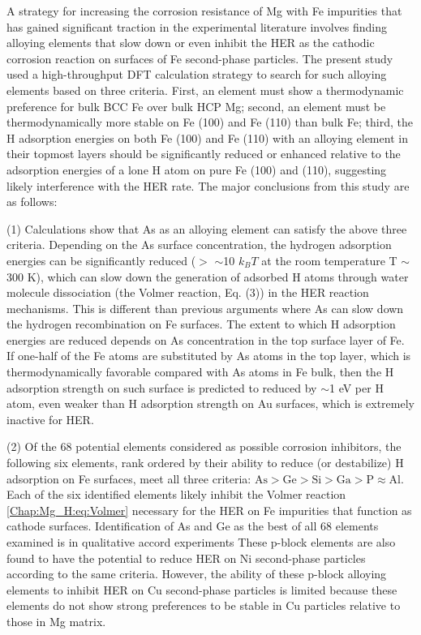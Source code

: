 A strategy for increasing the corrosion resistance of Mg with Fe impurities that has gained significant traction in the experimental literature involves finding alloying elements that slow down or even inhibit the HER as the cathodic corrosion reaction on surfaces of Fe second-phase particles. The present study used a high-throughput DFT calculation strategy to search for such alloying elements based on three criteria. First, an element must show a thermodynamic preference for bulk BCC Fe over bulk HCP Mg; second, an element must be thermodynamically more stable on Fe (100) and Fe (110) than bulk Fe; third, the H adsorption energies on both Fe (100) and Fe (110) with an alloying element in their topmost layers should be significantly reduced or enhanced relative to the adsorption energies of a lone H atom on pure Fe (100) and (110), suggesting likely interference with the HER rate. The major conclusions from this study are as follows:

 (1) Calculations show that As as an alloying element can satisfy the above three criteria. Depending on the As surface concentration, the hydrogen adsorption energies can be significantly reduced ($>$ $\sim$10 $k_{B}T$ at the room temperature T $\sim$ 300 K), which can slow down the generation of adsorbed H atoms through water molecule dissociation (the Volmer reaction, Eq. (3)) in the HER reaction mechanisms. This is different than previous arguments where As can slow down the hydrogen recombination on Fe surfaces. The extent to which H adsorption energies are reduced depends on As concentration in the top surface layer of Fe. If one-half of the Fe atoms are substituted by As atoms in the top layer, which is thermodynamically favorable compared with As atoms in Fe bulk, then the H adsorption strength on such surface is predicted to reduced by $\sim$1 eV per H atom, even weaker than H adsorption strength on Au surfaces, which is extremely inactive for HER.
 
(2) Of the 68 potential elements considered as possible corrosion inhibitors, the following six elements, rank ordered by their ability to reduce (or destabilize) H adsorption on Fe surfaces, meet all three criteria: $\text{As} > \text{Ge} > \text{Si} > \text{Ga} > \text{P} \approx \text{Al}$. Each of the six identified elements likely inhibit the Volmer reaction \ref{Chap:Mg_H:eq:Volmer} necessary for the HER on Fe impurities that function as cathode surfaces. Identification of As and Ge as the best of all 68 elements examined is in qualitative accord experiments These p-block elements are also found to have the potential to reduce \ac{HER} on Ni second-phase particles according to the same criteria. However, the ability of these p-block alloying elements to inhibit \ac{HER} on Cu second-phase particles is limited because these elements do not show strong preferences to be stable in Cu particles relative to those in Mg matrix.

